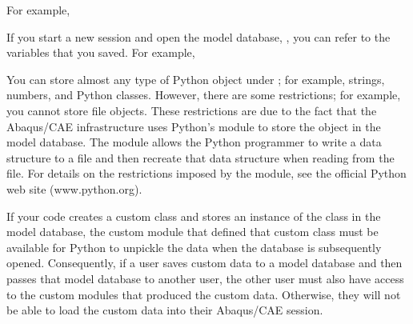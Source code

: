 \documentclass[letterpaper,10pt,english]{sphinxmanual}
\begin{document}
For example,

\begin{sphinxVerbatim}[commandchars=\\\{\},numbers=left,firstnumber=1,stepnumber=1]
 
  
  
  
\end{sphinxVerbatim}

If you start a new session and open the model database, , you can refer to the variables that you saved. For example,

\begin{sphinxVerbatim}[commandchars=\\\{\}]
 
  
\end{sphinxVerbatim}

You can store almost any type of Python object under ; for example, strings, numbers, and Python classes. However, there are some restrictions; for example, you cannot store file objects. These restrictions are due to the fact that the Abaqus/CAE infrastructure uses Python’s  module to store the  object in the model database. The  module allows the Python programmer to write a data structure to a file and then recreate that data structure when reading from the file. For details on the restrictions imposed by the  module, see the official Python web site (www.python.org).

If your code creates a custom class and stores an instance of the class in the model database, the custom module that defined that custom class must be available for Python to unpickle the data when the database is subsequently opened. Consequently, if a user saves custom data to a model database and then passes that model database to another user, the other user must also have access to the custom modules that produced the custom data. Otherwise, they will not be able to load the custom data into their Abaqus/CAE session.
\end{document}
